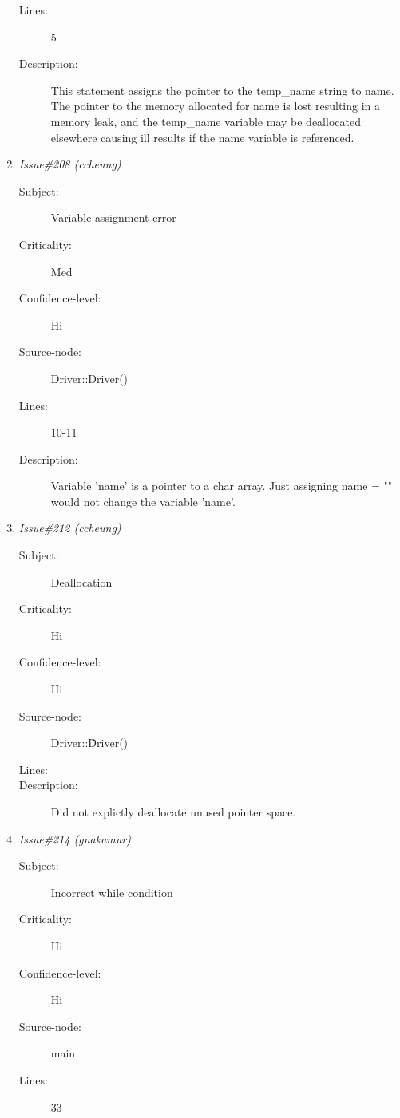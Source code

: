 \begin{enumerate}
\begin{description}
\item [Lines:] 5

\item [Description:] This statement assigns the pointer to the temp\_name string to 
name.  The pointer to the memory allocated for name is lost resulting in a
memory leak, and the temp\_name variable may be deallocated elsewhere causing
ill results if the name variable is referenced.
\end{description}
\item {\it Issue\#208 (ccheung)}
\begin{description}
\item [Subject:] Variable assignment error
\item [Criticality:] Med
\item [Confidence-level:] Hi
\item [Source-node:] Driver::Driver()

\item [Lines:] 10-11

\item [Description:] Variable 'name' is a pointer to a char array.  Just assigning 
name = "" would not change the variable 'name'.
\end{description}
\item {\it Issue\#212 (ccheung)}
\begin{description}
\item [Subject:] Deallocation
\item [Criticality:] Hi
\item [Confidence-level:] Hi
\item [Source-node:] Driver::\~Driver()

\item [Lines:] 

\item [Description:] Did not explictly deallocate unused pointer space.
\end{description}
\item {\it Issue\#214 (gnakamur)}
\begin{description}
\item [Subject:] Incorrect while condition
\item [Criticality:] Hi
\item [Confidence-level:] Hi
\item [Source-node:] main

\item [Lines:] 33


\end{description}
\end{enumerate}
